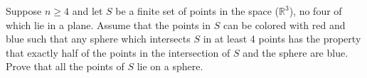 Suppose \(n\geq 4\) and let \(S\) be a finite set of points in the space (\(\mathbb{R}^3\)), no four of which lie in a plane. Assume that the points in \(S\) can be colored with red and blue such that any sphere which intersects \(S\) in at least 4 points has the property that exactly half of the points in the intersection of \(S\) and the sphere are blue. Prove that all the points of \(S\) lie on a sphere.